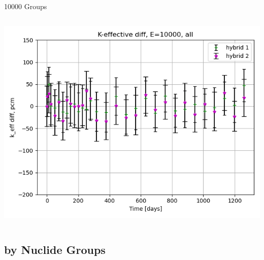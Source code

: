 \documentclass[
	11pt, %
	aspectratio=169, %
]{beamer}
\begin{document}
\begin{frame}{10000 Groups}
\begin{columns}[c]
\begin{column}{0.32\textwidth}
			\includegraphics[width=\textwidth]{../figures/keff/keff_all_10000_diff.png}
		\end{column}
	\end{columns}
\end{frame}

\subsection{by Nuclide Groups}
\end{document}
